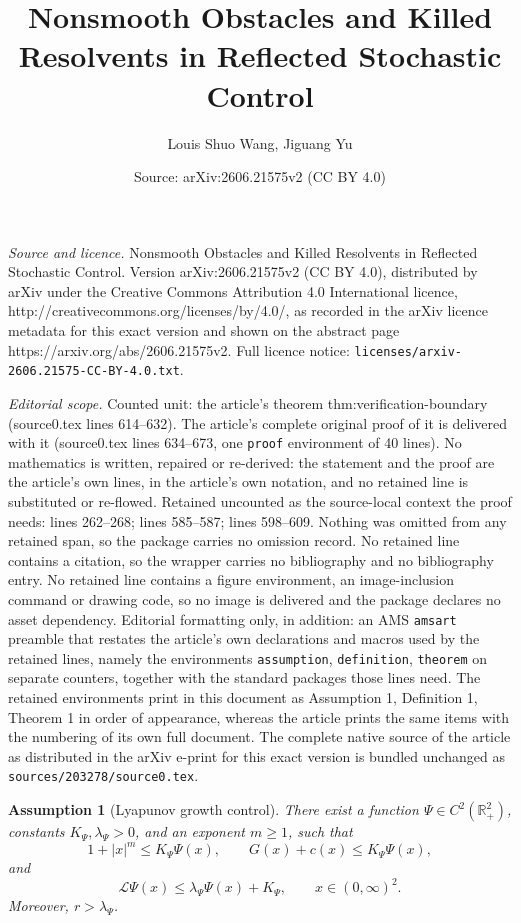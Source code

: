 \documentclass[10pt,a4paper]{amsart}
\title{Nonsmooth Obstacles and Killed Resolvents in Reflected Stochastic Control}
\author{Louis Shuo Wang, Jiguang Yu}
\date{Source: arXiv:2606.21575v2 (CC BY 4.0)}
\newtheorem{assumption}{Assumption}
\begin{document}
\maketitle

\noindent\emph{Source and licence.} Nonsmooth Obstacles and Killed Resolvents in Reflected Stochastic Control. Version arXiv:2606.21575v2 (CC BY 4.0), distributed by arXiv under the Creative Commons Attribution 4.0 International licence, http://creativecommons.org/licenses/by/4.0/, as recorded in the arXiv licence metadata for this exact version and shown on the abstract page https://arxiv.org/abs/2606.21575v2. Full licence notice: \texttt{licenses/arxiv-2606.21575-CC-BY-4.0.txt}.\par\smallskip

\noindent\textit{Editorial scope.} Counted unit: the article's theorem thm:verification-boundary (source0.tex lines 614--632). The article's complete original proof of it is delivered with it (source0.tex lines 634--673, one \texttt{proof} environment of 40 lines). No mathematics is written, repaired or re-derived: the statement and the proof are the article's own lines, in the article's own notation, and no retained line is substituted or re-flowed.  Retained uncounted as the source-local context the proof needs: lines 262--268; lines 585--587; lines 598--609.  Nothing was omitted from any retained span, so the package carries no omission record.  No retained line contains a citation, so the wrapper carries no bibliography and no bibliography entry.  No retained line contains a figure environment, an image-inclusion command or drawing code, so no image is delivered and the package declares no asset dependency.  Editorial formatting only, in addition: an AMS \texttt{amsart} preamble that restates the article's own declarations and macros used by the retained lines, namely the environments \texttt{assumption}, \texttt{definition}, \texttt{theorem} on separate counters, together with the standard packages those lines need.  The retained environments print in this document as Assumption 1, Definition 1, Theorem 1 in order of appearance, whereas the article prints the same items with the numbering of its own full document.  The complete native source of the article as distributed in the arXiv e-print for this exact version is bundled unchanged as \texttt{sources/203278/source0.tex}.
\begin{assumption}[Lyapunov growth control] \label{ass:lyapunov} 
There exist a function \(\Psi\in C^2(\mathbb R_+^2)\), constants \(K_\Psi,\lambda_\Psi>0\), and an exponent \(m\ge1\), such that 
\[ 1+|x|^m\le K_\Psi \Psi(x), \qquad G(x)+c(x)\le K_\Psi \Psi(x), \] 
and 
\[ \mathcal L\Psi(x)\le \lambda_\Psi \Psi(x)+K_\Psi, \qquad x\in(0,\infty)^2 . \] 
Moreover, \(r>\lambda_\Psi\). 
\end{assumption}
\end{document}
